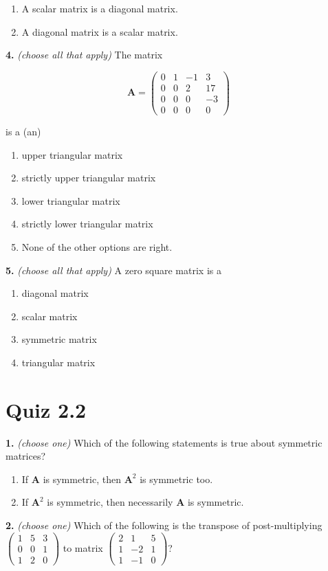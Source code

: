 \documentclass[10pt,a4paper]{article}
\begin{document}
\begin{enumerate}[label=(\Alph*)]
\item A scalar matrix is a diagonal matrix.
\item A diagonal matrix is a scalar matrix.
\end{enumerate}
\smallskip
\textbf{4.} \textit{(choose all that apply)} The matrix

\[\mathbf{A}=\begin{pmatrix}0&1&-1&3\\0&0&2&17\\0&0&0&-3\\0&0&0&0\end{pmatrix}\]

is a (an)

\begin{enumerate}[label=(\Alph*)]
\item upper triangular matrix
\item strictly upper triangular matrix
\item lower triangular matrix
\item strictly lower triangular matrix
\item None of the other options are right.
\end{enumerate}
\smallskip
\textbf{5.} \textit{(choose all that apply)} A zero square matrix is a

\begin{enumerate}[label=(\Alph*)]
\item diagonal matrix
\item scalar matrix
\item symmetric matrix
\item triangular matrix
\end{enumerate}
\smallskip
\section{Quiz 2.2}
\textbf{1.} \textit{(choose one)} Which of the following statements is true about symmetric matrices?

\begin{enumerate}[label=(\Alph*)]
\item If \(\mathbf{A}\) is symmetric, then \(\mathbf{A}^2\) is symmetric too.
\item If \(\mathbf{A}^2\) is symmetric, then necessarily \(\mathbf{A}\) is symmetric.
\end{enumerate}
\smallskip
\textbf{2.} \textit{(choose one)} Which of the following is the transpose of post-multiplying \(\begin{pmatrix}1&5&3\\0&0&1\\1&2&0\end{pmatrix}\) to matrix \(\begin{pmatrix}2&1&5\\1&-2&1\\1&-1&0\end{pmatrix}\)?
\end{document}
